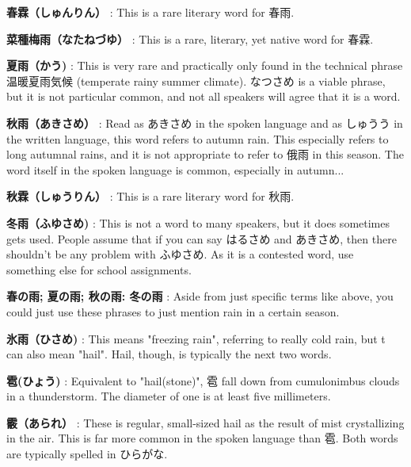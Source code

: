 \par{\textbf{春霖（しゅんりん） }: This is a rare literary word for 春雨. }

\par{\textbf{菜種梅雨（なたねづゆ） }: This is a rare, literary, yet native word for 春霖. }

\par{\textbf{夏雨（かう) }: This is very rare and practically only found in the technical phrase 温暖夏雨気候 (temperate rainy summer climate). なつさめ is a viable phrase, but it is not particular common, and not all speakers will agree that it is a word. }

\par{\textbf{秋雨（あきさめ） }: Read as あきさめ in the spoken language and as しゅうう in the written language, this word refers to autumn rain. This especially refers to long autumnal rains, and it is not appropriate to refer to 俄雨 in this season. The word itself in the spoken language is common, especially in autumn\dothyp{}\dothyp{}\dothyp{} }

\par{\textbf{秋霖（しゅうりん） }: This is a rare literary word for 秋雨. }

\par{\textbf{冬雨（ふゆさめ) }: This is not a word to many speakers, but it does sometimes gets used. People assume that if you can say はるさめ and あきさめ, then there shouldn't be any problem with ふゆさめ. As it is a contested word, use something else for school assignments. }

\par{\textbf{春の雨; 夏の雨; 秋の雨: 冬の雨 }: Aside from just specific terms like above, you could just use these phrases to just mention rain in a certain season. }

\par{\textbf{氷雨（ひさめ) }: This means "freezing rain", referring to really cold rain, but t can also mean "hail". Hail, though, is typically the next two words. }

\par{\textbf{雹(ひょう) }: Equivalent to "hail(stone)", 雹 fall down from cumulonimbus clouds in a thunderstorm. The diameter of one is at least five millimeters. }

\par{\textbf{霰（あられ） }: These is regular, small-sized hail as the result of mist crystallizing in the air. This is far more common in the spoken language than 雹. Both words are typically spelled in ひらがな. }

